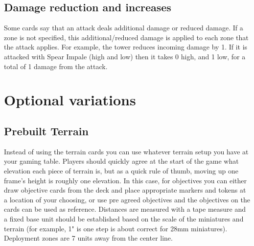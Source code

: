 \documentclass[a4paper, twocolumn]{article}
\begin{document}
\subsection{Damage reduction and increases}
Some cards say that an attack deals additional damage or reduced damage. If a zone is not specified, 
this additional/reduced damage is applied to each zone that the attack applies. For example, the tower reduces incoming damage by 1.
If it is attacked with Spear Impale (\smallpierce high and  low) then it takes 0 high, and 1 low, for a total of 1 damage from the attack.

\section{Optional variations}

\subsection{Prebuilt Terrain}
Instead of using the terrain cards you can use whatever terrain setup you have at your gaming table. 
Players should quickly agree at the start of the game what elevation each piece of terrain is,
but as a quick rule of thumb, moving up one frame's height is roughly one elevation.
In this case, for objectives you can either draw objective cards from the deck and place appropriate markers and tokens at a location of your choosing, 
or use pre agreed objectives and the objectives on the cards can be used as reference.
Distances are measured with a tape measure and a fixed base unit should be established based on the scale of the miniatures and terrain 
(for example, 1" is one step is about correct for 28mm miniatures). 
Deployment zones are 7 units away from the center line.
\end{document}
